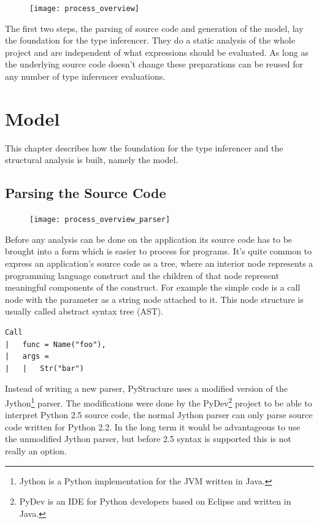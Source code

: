\documentclass[12pt,halfparskip,DIV11,BCOR10mm]{scrreprt}
\begin{document}
\begin{figure}[h!]
 \centering
 \texttt{[image: process\_overview]}
 \label{fig:process_overview}
\end{figure}

The first two steps, the parsing of source code and generation of the model, lay the foundation for the type inferencer. They do a static analysis of the whole project and are independent of what expressions should be evaluated. As long as the underlying source code doesn't change these preparations can be reused for any number of type inferencer evaluations.

\chapter{Model}

This chapter describes how the foundation for the type inferencer and the structural analysis is built, namely the model.

\section{Parsing the Source Code}

\begin{figure}
    \vspace{-0.6cm}
    \texttt{[image: process\_overview\_parser]}
\end{figure}

Before any analysis can be done on the application its source code has to be brought into a form which is easier to process for programs. It's quite common to express an application's source code as a tree, where an interior node represents a programming language construct and the children of that node represent meaningful components of the construct. For example the simple code  is a call node with the parameter as a string node attached to it. This node structure is usually called abstract syntax tree (AST).

\begin{lstlisting}
Call
|   func = Name("foo"),
|   args = 
|   |   Str("bar")
\end{lstlisting}

Instead of writing a new parser, PyStructure uses a modified version of the Jython\footnote{Jython is a Python implementation for the JVM written in Java.} parser. The modifications were done by the PyDev\footnote{PyDev is an IDE for Python developers based on Eclipse and written in Java.} project to be able to interpret Python 2.5 source code, the normal Jython parser can only parse source code written for Python 2.2. In the long term it would be advantageous to use the unmodified Jython parser, but before 2.5 syntax is supported this is not really an option.
\end{document}
